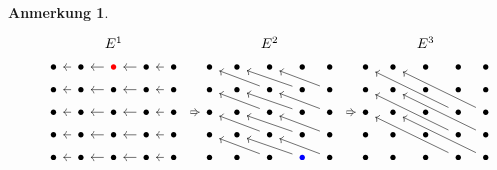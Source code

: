 \documentclass[12pt]{article}
\numberwithin{conj}{section}
\newtheorem{remark}[conj]{Anmerkung}
\begin{document}
\begin{remark}
        \[
            \begin{tikzcd}
                [sep=tiny] &&& {E^1} &&&&&& {E^2} &&&&&& {E^3} \\ & \bullet & \bullet & {\color{red}\bullet}
                & \bullet & \bullet && \bullet & \bullet & \bullet & \bullet & \bullet &&
                \bullet & \bullet & \bullet & \bullet & \bullet \\ {} & \bullet & \bullet
                & \bullet & \bullet & \bullet && \bullet & \bullet & \bullet & \bullet &
                \bullet && \bullet & \bullet & \bullet & \bullet & \bullet \\ & \bullet &
                \bullet & \bullet & \bullet & \bullet && \bullet & \bullet & \bullet &
                \bullet & \bullet && \bullet & \bullet & \bullet & \bullet & \bullet \\ &
                \bullet & \bullet & \bullet & \bullet & \bullet && \bullet & \bullet &
                \bullet & \bullet & \bullet && \bullet & \bullet & \bullet & \bullet & \bullet
                \\ & \bullet & \bullet & \bullet & \bullet & \bullet && \bullet &
                \bullet & \bullet & {\color{blue}\bullet} & \bullet && \bullet & \bullet
                & \bullet & \bullet & \bullet \arrow[from=2-3, to=2-2] \arrow[from=2-4,
                to=2-3] \arrow[from=2-5, to=2-4] \arrow[from=2-6, to=2-5] \arrow[from=3-3,
                to=3-2] \arrow[from=3-4, to=3-3] \arrow[from=3-5, to=3-4] \arrow[from=3-6,
                to=3-5] \arrow[from=3-10, to=2-8] \arrow[from=3-11, to=2-9] \arrow[from=3-12,
                to=2-10] \arrow[from=4-3, to=4-2] \arrow[from=4-4, to=4-3] \arrow[from=4-5,
                to=4-4] \arrow[from=4-6, to=4-5] \arrow[shorten <=5pt, Rightarrow, from=4-6,
                to=4-8] \arrow[from=4-10, to=3-8] \arrow[from=4-11, to=3-9] \arrow[from=4-12,
                to=3-10] \arrow[shorten <=5pt, Rightarrow, from=4-12, to=4-14] \arrow[from=4-17,
                to=2-14] \arrow[from=4-18, to=2-15] \arrow[from=5-3, to=5-2] \arrow[from=5-4,
                to=5-3] \arrow[from=5-5, to=5-4] \arrow[from=5-6, to=5-5] \arrow[from=5-10,
                to=4-8] \arrow[from=5-11, to=4-9] \arrow[from=5-12, to=4-10] \arrow[from=5-17,
                to=3-14] \arrow[from=5-18, to=3-15] \arrow[from=6-3, to=6-2] \arrow[from=6-4,
                to=6-3] \arrow[from=6-5, to=6-4] \arrow[from=6-6, to=6-5] \arrow[from=6-10,
                to=5-8] \arrow[from=6-11, to=5-9] \arrow[from=6-12, to=5-10] \arrow[from=6-17,
                to=4-14] \arrow[from=6-18, to=4-15]
            \end{tikzcd}
        \]
    \end{remark}
\end{document}
